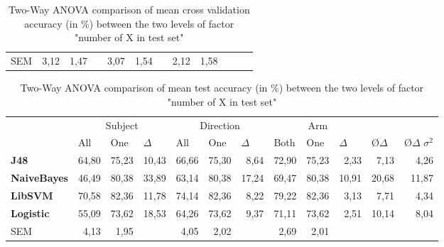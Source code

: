 \documentclass[journal]{IEEEtran}
\begin{document}
\begin{table}
\begin{tabular}{lrrrrrrrrrrr}
SEM        & 3,12                                      & 1,47                                     &                                    & 3,07                                        & 1,54                                       &                                    & 2,12                                   & 1,58                                 &                                    &                                         &                                               
\end{tabular}
\caption{Two-Way ANOVA comparison of mean cross validation accuracy (in \%) between the two levels of factor "number of X in test set"}
\label{tab:anova-mean-cv-difference}
\end{table}

\begin{table}
\centering
\begin{tabular}{lrrrrrrrrrrr}
                      & \multicolumn{3}{c}{Subject}                                                      & \multicolumn{3}{c}{Direction}                                                    & \multicolumn{3}{c}{Arm}                                                           & \multicolumn{1}{l}{}            & \multicolumn{1}{l}{}                       \\
\textbf{}             & \multicolumn{1}{l}{All} & \multicolumn{1}{l}{One} & \multicolumn{1}{l}{$\Delta$} & \multicolumn{1}{l}{All} & \multicolumn{1}{l}{One} & \multicolumn{1}{l}{$\Delta$} & \multicolumn{1}{l}{Both} & \multicolumn{1}{l}{One} & \multicolumn{1}{l}{$\Delta$} & \multicolumn{1}{l}{\O $\Delta$} & \multicolumn{1}{l}{\O $\Delta$ $\sigma^2$} \\ \hline
\textbf{J48}        & 64,80 & 75,23 & 10,43 & 66,66 & 75,30 & 8,64  & 72,90 & 75,23 & 2,33  & 7,13  & 4,26  \\
\textbf{NaiveBayes} & 46,49 & 80,38 & 33,89 & 63,14 & 80,38 & 17,24 & 69,47 & 80,38 & 10,91 & 20,68 & 11,87 \\
\textbf{LibSVM}     & 70,58 & 82,36 & 11,78 & 74,14 & 82,36 & 8,22  & 79,22 & 82,36 & 3,13  & 7,71  & 4,34  \\
\textbf{Logistic}   & 55,09 & 73,62 & 18,53 & 64,26 & 73,62 & 9,37  & 71,11 & 73,62 & 2,51  & 10,14 & 8,04  \\ \hline
SEM        & 4,13  & 1,95  &       & 4,05  & 2,02  &       & 2,69  & 2,01  &       &       &
\end{tabular}
\caption{Two-Way ANOVA comparison of mean test accuracy (in \%) between the two levels of factor "number of X in test set"}
\label{tab:anova-mean-test-difference}
\end{table}
\end{document}
